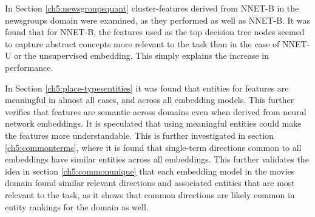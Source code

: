 In Section \ref{ch5:newsgroupsquant} cluster-features derived from NNET-B in the newsgroups domain were examined, as they performed as well as NNET-B. It was found that for NNET-B, the features used as the top decision tree nodes seemed to capture abstract concepts more relevant to the task than in the case of NNET-U or the unsupervised embedding. This simply explains the increase in performance.

In Section \ref{ch5:place-typesentities} it was found that entities for features are meaningful in almost all cases, and across all embedding models. This further verifies that features are semantic across domains even when derived from neural network embeddings. It is speculated that using meaningful entities could make the features more understandable. This is further investigated in section \ref{ch5:commonterms}, where it is found that single-term directions common to all embeddings have similar entities across all embeddings. This further validates the idea in section \ref{ch5:commonunique} that each embedding model in the movies domain found similar relevant directions and associated entities that are most relevant to the task, as it shows that common directions are likely common in entity rankings for the domain as well.

















